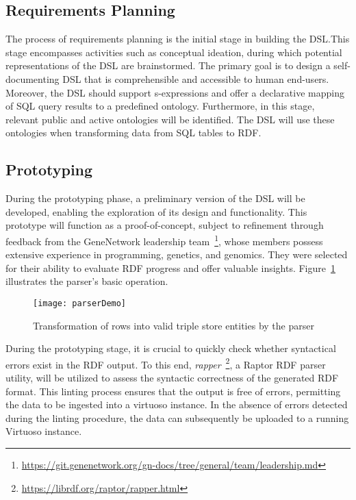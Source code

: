 \subsection{Requirements Planning}

The process of requirements planning is the initial stage in building the DSL.\@  This stage encompasses activities such as conceptual ideation, during which potential representations of the DSL are brainstormed.  The primary goal is to design a self-documenting DSL that is comprehensible and accessible to human end-users.  Moreover, the DSL should support s-expressions and offer a declarative mapping of SQL query results to a predefined ontology.  Furthermore, in this stage, relevant public and active ontologies will be identified.  The DSL will use these ontologies when transforming data from SQL tables to RDF\@.

\subsection{Prototyping}

During the prototyping phase, a preliminary version of the DSL will be developed, enabling the exploration of its design and functionality.  This prototype will function as a proof-of-concept, subject to refinement through feedback from the GeneNetwork leadership team~\footnote{\url{https://git.genenetwork.org/gn-docs/tree/general/team/leadership.md}}, whose members possess extensive experience in programming, genetics, and genomics.  They were selected for their ability to evaluate RDF progress and offer valuable insights.  Figure~\ref{fig:parser-demo} illustrates the parser's basic operation.

\begin{figure}[H]
\centering
\texttt{[image: parserDemo]}
\caption{Transformation of rows into valid triple store entities by the parser}\label{fig:parser-demo}
\centering
\end{figure}

During the prototyping stage, it is crucial to quickly check whether syntactical errors exist in the RDF output.  To this end, \textit{rapper}~\footnote{\url{https://librdf.org/raptor/rapper.html}}, a Raptor RDF parser utility, will be utilized to assess the syntactic correctness of the generated RDF format.  This linting process ensures that the output is free of errors, permitting the data to be ingested into a virtuoso instance.  In the absence of errors detected during the linting procedure, the data can subsequently be uploaded to a running Virtuoso instance.

